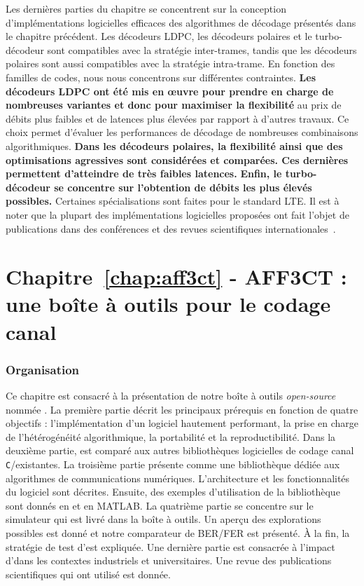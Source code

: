 Les dernières parties du chapitre se concentrent sur la conception
d'implémentations logicielles efficaces des algorithmes de décodage présentés
dans le chapitre précédent. Les décodeurs LDPC, les décodeurs polaires et le
turbo-décodeur sont compatibles avec la stratégie inter-trames, tandis que les
décodeurs polaires sont aussi compatibles avec la stratégie intra-trame. En
fonction des familles de codes, nous nous concentrons sur différentes
contraintes. \textbf{Les décodeurs LDPC ont été mis en œuvre pour prendre en
charge de nombreuses variantes et donc pour maximiser la flexibilité} au prix de
débits plus faibles et de latences plus élevées par rapport à d'autres travaux.
Ce choix permet d'évaluer les performances de décodage de nombreuses
combinaisons algorithmiques. \textbf{Dans les décodeurs polaires, la flexibilité
ainsi que des optimisations agressives sont considérées et comparées. Ces
dernières permettent d'atteindre de très faibles latences.} \textbf{Enfin, le
turbo-décodeur se concentre sur l'obtention de débits les plus élevés
possibles.} Certaines spécialisations sont faites pour le standard LTE. Il est à
noter que la plupart des implémentations logicielles proposées ont fait l'objet
de publications dans des conférences et des revues scientifiques
internationales~\cite{Ghaffari2019,Leonardon2019,Cassagne2015c,Cassagne2016b,
Cassagne2016a}.

\section*{Chapitre~\ref{chap:aff3ct} - AFF3CT : une boîte à outils pour le codage canal}

\subsubsection*{Organisation}

Ce chapitre est consacré à la présentation de notre boîte à outils
\emph{open-source} nommée \AFFECT. La première partie décrit les principaux
prérequis en fonction de quatre objectifs : l'implémentation d'un logiciel
hautement performant, la prise en charge de l'hétérogénéité algorithmique, la
portabilité et la reproductibilité. Dans la deuxième partie, \AFFECT est comparé
aux autres bibliothèques logicielles de codage canal \verb|C|/\Cxx existantes.
La troisième partie présente \AFFECT comme une bibliothèque dédiée aux
algorithmes de communications numériques. L'architecture et les fonctionnalités
du logiciel sont décrites. Ensuite, des exemples d'utilisation de la
bibliothèque sont donnés en \Cxx et en MATLAB\R. La quatrième partie se
concentre sur le simulateur \AFFECT qui est livré dans la boîte à outils. Un
aperçu des explorations possibles est donné et notre comparateur de BER/FER est
présenté. À la fin, la stratégie de test d'\AFFECT est expliquée. Une dernière
partie est consacrée à l'impact d'\AFFECT dans les contextes industriels et
universitaires. Une revue des publications scientifiques qui ont utilisé \AFFECT
est donnée.

